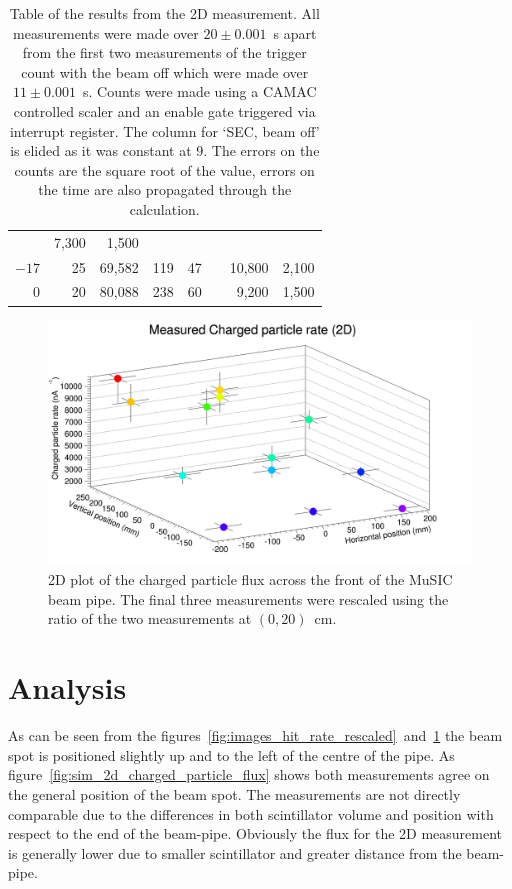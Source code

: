 \begin{table}
\begin{center}
\begin{tabular}{r|r|r|c|c|c|r@{~\(\pm\)~}r}
                                                                                           &   7,300  &  1,500 \\
       \(-17\)  &   25     &           69,582 & 119               &   47        &          &  10,800  &  2,100 \\
         0      &   20     &           80,088 & 238               &   60        &          &   9,200  &  1,500 \\
    \end{tabular}
  \end{center}
  \caption{Table of the results from the 2D measurement. All measurements were made over \( 20\pm0.001 \)~s apart from the first two measurements of the trigger count with the beam off which were made over \( 11\pm0.001 \)~s. Counts were made using a CAMAC controlled scaler and an enable gate triggered via interrupt register. The column for `SEC, beam off' is elided as it was constant at 9. The errors on the counts are the square root of the value, errors on the time are also propagated through the calculation.}
  \label{tab:2d_res}
\end{table}
 
\begin{figure}[hptb]
  \centering
  \includegraphics[width=.9\textwidth]{images/plot_generating_scripts/measured_2d_charged_flux.png}
  \caption{2D plot of the charged particle flux across the front of the MuSIC beam pipe. The final three measurements were rescaled using the ratio of the two measurements at \((0,20)\)~cm.}
  \label{fig:2D_flux}
\end{figure}
 
\section{Analysis} %
\label{sec:analysis}
As can be seen from the figures~\ref{fig:images_hit_rate_rescaled}~and~\ref{fig:2D_flux} the beam spot is positioned slightly up and to the left of the centre of the pipe. As figure~\ref{fig:sim_2d_charged_particle_flux} shows both measurements agree on the general position of the beam spot. The measurements are not directly comparable due to the differences in both scintillator volume and position with respect to the end of the beam-pipe. Obviously the flux for the 2D measurement is generally lower due to smaller scintillator and greater distance from the beam-pipe.

